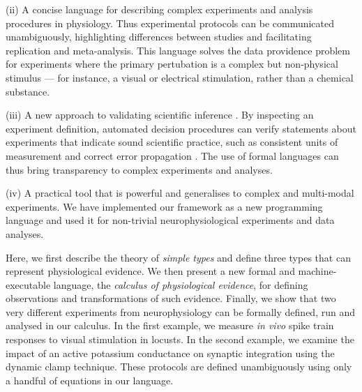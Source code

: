 (ii) A concise language for describing complex experiments and
analysis procedures in physiology. Thus experimental protocols can be
communicated unambiguously, highlighting differences between studies
and facilitating replication and meta-analysis. This language solves
the data providence problem \citep{Pool2002} for experiments where the
primary pertubation is a complex but non-physical stimulus --- for
instance, a visual or electrical stimulation, rather than a chemical
substance.

(iii) A new approach to validating scientific inference
\citep{Editors2003, Editors2010, DeSchutter2010}. By inspecting an
experiment definition, automated decision procedures can verify
statements about experiments that indicate sound scientific practice,
such as consistent units of measurement \citep{Kennedy1997} and
correct error propagation \citep{Taylor1997}. The use of formal
languages can thus bring transparency to complex experiments and
analyses.

(iv) A practical tool that is powerful and generalises to complex and
multi-modal experiments. We have implemented our framework as a new
programming language and used it for non-trivial neurophysiological
experiments and data analyses.

Here, we first describe the theory of \emph{simple types}
\citep{Pierce2002} and define three types that can represent
physiological evidence. We then present a new formal and
machine-executable language, the \emph{calculus of physiological
  evidence}, for defining observations and transformations of such
evidence. Finally, we show that two very different experiments from
neurophysiology can be formally defined, run and analysed in our
calculus. In the first example, we measure \emph{in vivo} spike train
responses to visual stimulation in locusts. In the second example, we
examine the impact of an active potassium conductance on synaptic
integration using the dynamic clamp technique. These protocols are
defined unambiguously using only a handful of equations in our
language.


